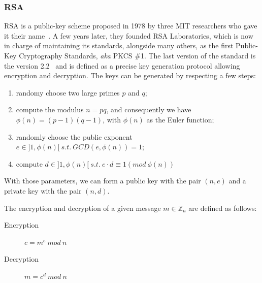 \subsubsection{RSA}
RSA is a public-key scheme proposed in 1978 by three MIT researchers who gave it their name~\cite{Rivest:1978:MOD:359340.359342}.
A few years later, they founded RSA Laboratories, which is now in charge of maintaining its standards, alongside many others, as the first Public-Key Cryptography Standards, \textit{aka} PKCS \#1.
The last version of the standard is the version 2.2~\cite{pkcs1} and is defined as a precise key generation protocol allowing encryption and decryption.
The keys can be generated by respecting a few steps:
\begin{enumerate}
	\item randomy choose two large primes $p$ and $q$;
	\item compute the modulus $n = p q$, and consequently we have $\phi(n) = (p-1)(q-1)$, with $\phi(n)$ as the Euler function;
	\item randomly choose the public exponent $e \in ]1,\phi(n)[\ s.t.\ GCD(e,\phi(n)) = 1$;
	\item compute $d \in ]1,\phi(n)[\ s.t.\ e \cdot d \equiv 1 (mod\ \phi(n))$
\end{enumerate}

With those parameters, we can form a public key with the pair $(n, e)$ and a private key with the pair $(n, d)$.

The encryption and decryption of a given message $m \in \mathds{Z}_n$ are defined as follows:
\begin{description}
	\item[Encryption] $c = m^e\ mod\ n$
	\item[Decryption] $m = c^d\ mod\ n$
\end{description}


